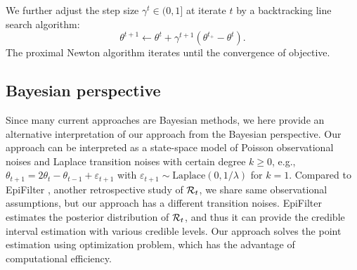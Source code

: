 We further adjust the step size $\gamma^t \in (0,1]$ at iterate $t$ by a backtracking line search algorithm: 
$$\theta^{t+1} \leftarrow \theta^t + \gamma^{t+1} (\theta^{t_+} - \theta^t).$$ The proximal Newton algorithm iterates until the convergence of objective.


\subsection{Bayesian perspective}

Since many current approaches are Bayesian methods, we here provide an alternative interpretation of our approach from the Bayesian perspective. Our approach can be interpreted as a state-space model of Poisson observational noises and Laplace transition noises with certain degree $k\geq 0$, e.g., $\theta_{t+1} = 2\theta_t - \theta_{t-1} + \varepsilon_{t+1}$ with $\varepsilon_{t+1}\sim \mathrm{Laplace}(0,1/\lambda)$ for $k=1$. Compared to EpiFilter \citep{parag2021improved}, another retrospective study of $\mathcal{R}_t$, we share same observational assumptions, but our approach has a different transition noises. 
EpiFilter estimates the posterior distribution of $\mathcal{R}_t$, and thus it can provide the credible interval estimation with various credible levels. Our approach solves the point estimation using optimization problem, which has the advantage of computational efficiency. 
